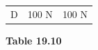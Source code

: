 \begin{enumerate}[noitemsep, label=\textbf{\arabic*}. ]
{\begin{center}
\begin{xtabular*}{\mytablewidth}[t]{|p{10\mystarwidth}|p{10\mystarwidth}|p{10\mystarwidth}|}
    
        D &
    
    
        100 N &
    
    
        100 N%
     \tabularnewline{}
    \end{xtabular*}
      \end{center}
    \begin{center}{\small\bfseries Table 19.10}\end{center}
    
    \addtocounter{footnote}{-0}
    
        }%
      

\end{enumerate}
